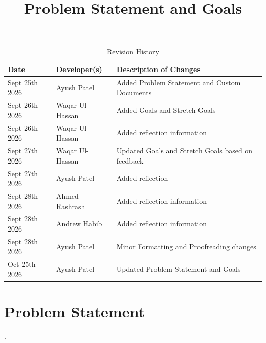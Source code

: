 \documentclass{article}
\title{Problem Statement and Goals\\\projname}
\author{\authname}
\date{}
\begin{document}
\maketitle

\begin{table}[hp]
    \caption{Revision History} \label{TblRevisionHistory}
    \begin{tabularx}{\textwidth}{llX}
        \toprule
        \textbf{Date}  & \textbf{Developer(s)} & \textbf{Description of Changes}                   \\
        \midrule
        Sept 25th 2026 & Ayush Patel           & Added Problem Statement and Custom Documents      \\
        Sept 26th 2026 & Waqar Ul-Hassan       & Added Goals and Stretch Goals                     \\
        Sept 26th 2026 & Waqar Ul-Hassan       & Added reflection information                      \\
        Sept 27th 2026 & Waqar Ul-Hassan       & Updated Goals and Stretch Goals based on feedback \\
        Sept 27th 2026 & Ayush Patel           & Added reflection                                  \\
        Sept 28th 2026 & Ahmed Rashrash        & Added reflection information                      \\
        Sept 28th 2026 & Andrew Habib          & Added reflection information                      \\
        Sept 28th 2026 & Ayush Patel           & Minor Formatting and Proofreading changes         \\
        Oct 25th 2026  & Ayush Patel           & Updated Problem Statement and Goals               \\
        \bottomrule
    \end{tabularx}
\end{table}

\section{Problem Statement}

.

\end{document}
